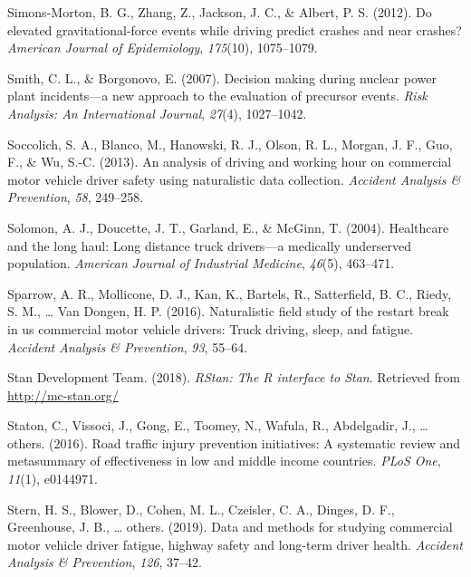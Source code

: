 \documentclass[12pt]{book}
\numberwithin{equation}{chapter}
\begin{document}
\leavevmode\hypertarget{ref-simons2012elevated}{}%
Simons-Morton, B. G., Zhang, Z., Jackson, J. C., \& Albert, P. S. (2012). Do elevated gravitational-force events while driving predict crashes and near crashes? \emph{American Journal of Epidemiology}, \emph{175}(10), 1075--1079.

\leavevmode\hypertarget{ref-smith2007decision}{}%
Smith, C. L., \& Borgonovo, E. (2007). Decision making during nuclear power plant incidents---a new approach to the evaluation of precursor events. \emph{Risk Analysis: An International Journal}, \emph{27}(4), 1027--1042.

\leavevmode\hypertarget{ref-soccolich2013analysis}{}%
Soccolich, S. A., Blanco, M., Hanowski, R. J., Olson, R. L., Morgan, J. F., Guo, F., \& Wu, S.-C. (2013). An analysis of driving and working hour on commercial motor vehicle driver safety using naturalistic data collection. \emph{Accident Analysis \& Prevention}, \emph{58}, 249--258.

\leavevmode\hypertarget{ref-solomon2004healthcare}{}%
Solomon, A. J., Doucette, J. T., Garland, E., \& McGinn, T. (2004). Healthcare and the long haul: Long distance truck drivers---a medically underserved population. \emph{American Journal of Industrial Medicine}, \emph{46}(5), 463--471.

\leavevmode\hypertarget{ref-sparrow2016naturalistic}{}%
Sparrow, A. R., Mollicone, D. J., Kan, K., Bartels, R., Satterfield, B. C., Riedy, S. M., \ldots{} Van Dongen, H. P. (2016). Naturalistic field study of the restart break in us commercial motor vehicle drivers: Truck driving, sleep, and fatigue. \emph{Accident Analysis \& Prevention}, \emph{93}, 55--64.

\leavevmode\hypertarget{ref-rstancitation}{}%
Stan Development Team. (2018). \emph{RStan: The R interface to Stan}. Retrieved from \url{http://mc-stan.org/}

\leavevmode\hypertarget{ref-staton2016road}{}%
Staton, C., Vissoci, J., Gong, E., Toomey, N., Wafula, R., Abdelgadir, J., \ldots{} others. (2016). Road traffic injury prevention initiatives: A systematic review and metasummary of effectiveness in low and middle income countries. \emph{PLoS One}, \emph{11}(1), e0144971.

\leavevmode\hypertarget{ref-stern2019data}{}%
Stern, H. S., Blower, D., Cohen, M. L., Czeisler, C. A., Dinges, D. F., Greenhouse, J. B., \ldots{} others. (2019). Data and methods for studying commercial motor vehicle driver fatigue, highway safety and long-term driver health. \emph{Accident Analysis \& Prevention}, \emph{126}, 37--42.
\end{document}
